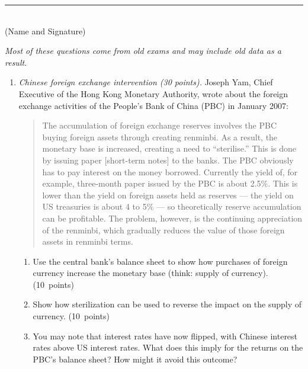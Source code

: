 \documentclass[letterpaper,12pt]{article}
\begin{document}
\begin{flushright}
\rule{4in}{0.5pt} \\ (Name and Signature)
\end{flushright}

{\it Most of these questions come from old exams and may include old data as a result. }

\begin{enumerate}
\item {\it Chinese foreign exchange intervention (30 points).}
Joseph Yam, Chief Executive of the Hong Kong Monetary Authority, wrote about the foreign exchange activities of the People's Bank of China (PBC) in January 2007:  
%
\begin{quote}
The accumulation of foreign exchange reserves 
involves the PBC buying foreign assets through creating renminbi.
As a result, the monetary base is increased, creating a need to ``sterilise.''
This is done by issuing paper [short-term notes] to the banks.  
The PBC obviously has to pay interest on the money borrowed.  
Currently the yield of, for example, three-month paper issued by the PBC is about 2.5\%.
This is lower than the yield on foreign assets held as reserves ---
the yield on US treasuries is about 4 to 5\% --- so theoretically
reserve accumulation can be profitable.  
The problem, however, is the continuing appreciation of the renminbi, 
which gradually reduces the value of those foreign assets in renminbi terms.
\end{quote}

\begin{enumerate}
\item Use the central bank's balance sheet to show how purchases of
foreign currency increase the monetary base (think:  supply of currency). 
(10~points)  

\item Show how sterilization can be used to reverse the impact on 
the supply of currency.
(10~points)

\item You may note that interest rates have now flipped, with Chinese interest rates above US interest rates.  
    What does this imply for the returns on the PBC's balance sheet?
    How might it avoid this outcome?      
\end{enumerate}


\end{enumerate}
\end{document}
